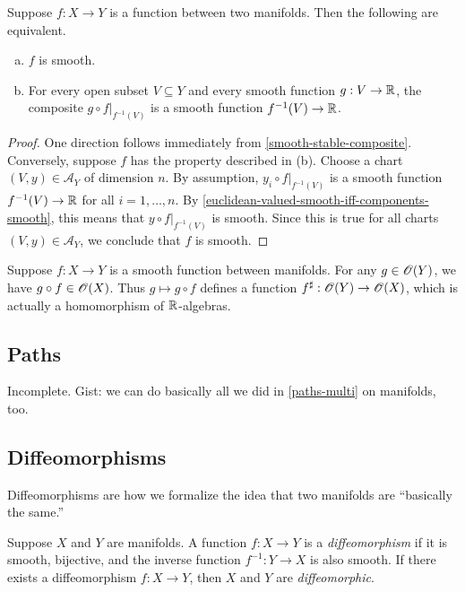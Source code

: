 \begin{proposition} \label{smooth-iff-real-valued-pullbacks-smooth}
	Suppose $f : X \to Y$ is a function between two manifolds. Then the following are equivalent. 
	\begin{enumerate}[(a)]
		\item $f$ is smooth. 
		\item For every open subset $V \subseteq Y$ and every smooth function $g :  V \to \mathbb{R}$, the composite $g \circ f|_{f^{-1}(V)}$ is a smooth function $f^{-1}(V) \to \mathbb{R}$. 
	\end{enumerate}
\end{proposition}

\begin{proof}
	One direction follows immediately from \cref{smooth-stable-composite}. Conversely, suppose $f$ has the property described in (b). Choose a chart $(V, y) \in \mathscr{A}_Y$ of dimension $n$. By assumption, $y_i \circ f|_{f^{-1}(V)}$ is a smooth function $f^{-1}(V) \to \mathbb{R}$ for all $i = 1, \dotsc, n$. By \cref{euclidean-valued-smooth-iff-components-smooth}, this means that $y \circ f|_{f^{-1}(V)}$ is smooth. Since this is true for all charts $(V, y) \in \mathscr{A}_Y$, we conclude that $f$ is smooth.  
\end{proof}

\begin{unimportantremark}
	Suppose $f : X \to Y$ is a smooth function between manifolds. For any $g \in \mathscr{O}(Y)$, we have $g \circ f \in \mathscr{O}(X)$. Thus $g \mapsto g \circ f$ defines a function $f^\sharp : \mathscr{O}(Y) \to \mathscr{O}(X)$, which is actually a homomorphism of $\mathbb{R}$-algebras.
\end{unimportantremark}

\subsection{Paths}

{\color{blue} Incomplete. Gist: we can do basically all we did in \cref{paths-multi} on manifolds, too.}


\subsection{Diffeomorphisms}

Diffeomorphisms are how we formalize the idea that two manifolds are ``basically the same.''

\begin{definition}[Diffeomorphism] 
	Suppose $X$ and $Y$ are manifolds. A function $f : X \to Y$ is a \emph{diffeomorphism} if it is smooth, bijective, and the inverse function $f^{-1} : Y \to X$ is also smooth. If there exists a diffeomorphism $f : X \to Y$, then $X$ and $Y$ are \emph{diffeomorphic}. 
\end{definition}


